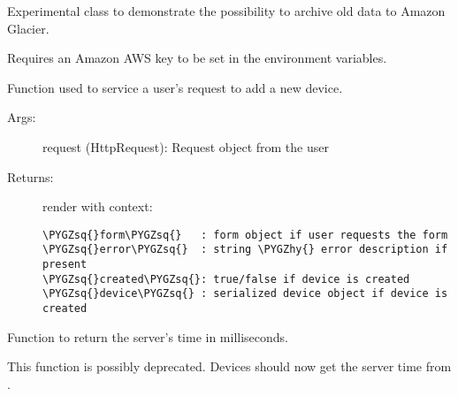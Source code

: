 \documentclass[letterpaper,10pt,english]{sphinxmanual}
\def\PYGZhy{\char`\-}
\def\PYGZsq{\char`\'}
\renewcommand\PYGZsq{\textquotesingle}
\begin{document}

\begin{fulllineitems}
\label{modules/microdata:microdata.views.initiate_job_to_glacier}
Experimental class to demonstrate the possibility to archive old data to Amazon Glacier.

Requires an Amazon AWS key to be set in the environment variables.

\end{fulllineitems}


\begin{fulllineitems}
\label{modules/microdata:microdata.views.new_device}
Function used to service a user's request to add a new device.
\begin{description}
\item[{Args:}] \leavevmode
request (HttpRequest): Request object from the user

\item[{Returns:}] \leavevmode
render with context:

\begin{Verbatim}[commandchars=\\\{\}]
\PYGZsq{}form\PYGZsq{}   : form object if user requests the form
\PYGZsq{}error\PYGZsq{}  : string \PYGZhy{} error description if present
\PYGZsq{}created\PYGZsq{}: true/false if device is created
\PYGZsq{}device\PYGZsq{} : serialized device object if device is created
\end{Verbatim}

\end{description}

\end{fulllineitems}


\begin{fulllineitems}
\label{modules/microdata:microdata.views.timestamp}
Function to return the server's time in milliseconds.

This function is possibly deprecated. Devices should now get the server time
from .

\end{fulllineitems}
\end{document}
